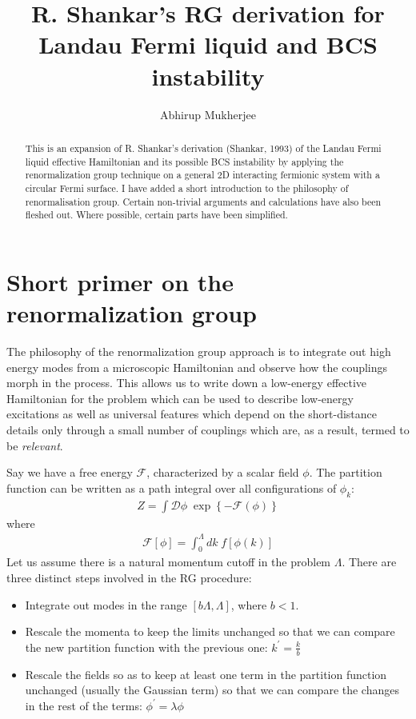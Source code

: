 \documentclass{article}
\begin{document}
\title{\bf R. Shankar's RG derivation for Landau Fermi liquid and BCS instability}
\author{Abhirup Mukherjee}
\maketitle

\begin{abstract}
This is an expansion of R. Shankar's derivation (Shankar, 1993) of the Landau Fermi liquid effective Hamiltonian and its possible BCS instability by applying the renormalization group technique on a general 2D interacting fermionic system with a circular Fermi surface. I have added a short introduction to the philosophy of renormalisation group. Certain non-trivial arguments and calculations have also been fleshed out. Where possible, certain parts have been simplified.
\end{abstract}

\section{Short primer on the renormalization group}
The philosophy of the renormalization group approach is to integrate out high energy modes from a microscopic Hamiltonian and observe how the couplings morph in the process. This allows us to write down a low-energy effective Hamiltonian for the problem which can be used to describe low-energy excitations as well as universal features which depend on the short-distance details only through a small number of couplings which are, as a result, termed to be \textit{relevant}.

Say we have a free energy \(\mathcal{F}\), characterized by a scalar field \(\phi\). The partition function can be written as a path integral over all configurations of \(\phi_k\):
\begin{equation}\begin{aligned}
\label{oldpart}
Z = \int \mathcal{D}\phi \;\exp\left\{-\mathcal{F}(\phi)\right\}
\end{aligned}\end{equation}
where 
\begin{equation}\begin{aligned}
\mathcal{F}[\phi] = \int_0^\Lambda dk \;f[\phi(k)]
\end{aligned}\end{equation}
Let us assume there is a natural momentum cutoff in the problem \(\Lambda\). There are three distinct steps involved in the RG procedure:
\begin{itemize}
	\item Integrate out modes in the range \(\left[b\Lambda,\Lambda\right]\), where \(b < 1\).
	\item Rescale the momenta to keep the limits unchanged so that we can compare the new partition function with the previous one: \(k^\prime = \frac{k}{b}\)
	\item Rescale the fields so as to keep at least one term in the partition function unchanged (usually the Gaussian term) so that we can compare the changes in the rest of the terms: \(\phi^\prime = \lambda\phi\)
\end{itemize}
\end{document}
